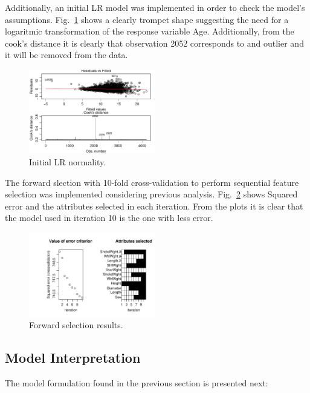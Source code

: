 \documentclass[10pt, paper=a4]{article}
\begin{document}
Additionally, an initial LR model was implemented in order to check the model's assumptions. Fig.~\ref{fig:modelcheck} shows a clearly trompet shape suggesting the need for a logaritmic transformation of the response variable Age. Additionally, from the cook's distance it is clearly that observation 2052 corresponds to and outlier and it will be removed from the data.

\newpage
\begin{figure}[h]
  \centering
  \includegraphics[width = 0.49\textwidth]{modelcheck.pdf}
  \caption{Initial LR normality.}
  \label{fig:modelcheck}
\end{figure}

The forward slection with 10-fold cross-validation to perform sequential feature selection was implemented considering previous analysis. Fig.~\ref{fig:forwardselection} shows Squared error and the attributes selected in each iteration. From the plots it is clear that the model used in iteration 10 is the one with less error.

\begin{figure}[h]
  \centering
  \includegraphics[width = 0.49\textwidth]{forwardselection.pdf}
  \caption{Forward selection results.}
  \label{fig:forwardselection}
\end{figure}

\subsection{Model Interpretation}
The model formulation found in the previous section is presented next:\\
\end{document}
